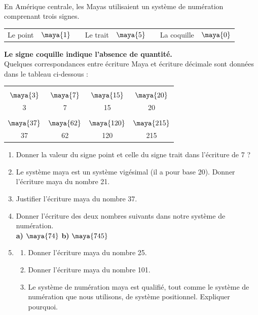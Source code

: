 \activites 

\begin{activite}
   \ \\ [-16mm]
   \begin{QCM}
      En Amérique centrale, les Mayas utilisaient un système de numération comprenant trois signes.
\begin{center}
   \begin{tabular}{ccp{1cm}ccp{1cm}cc}
      Le point & \Large$\maya{1}$ & & Le trait & \Large$\maya{5}$ & & La coquille & \Large$\maya{0}$ \\   
   \end{tabular}
\end{center}
{\bf Le signe \og coquille \fg{} indique l'absence de quantité.} \\ [2mm]
Quelques correspondances entre écriture Maya et écriture décimale sont données dans le tableau ci-dessous :
\begin{center}
   {
   \begin{tabular}{|C{2}|C{2}|C{2}|C{2}|}
      \hline
      &&&\\ [-5mm]
      \huge$\maya{3}$ & \Large$\maya{7}$ & \Large$\maya{15}$ & \Large$\maya{20}$ \\
      3 & 7 & 15 & 20 \\
      \hline
      &&&\\ [-5mm]
      \Large$\maya{37}$ & \Large$\maya{62}$ & \Large$\maya{120}$ & \Large$\maya{215}$ \\
      37 & 62 & 120 & 215 \\
      \hline
   \end{tabular}}
\end{center}
\begin{enumerate}
   \item Donner la valeur du signe \og point \fg{} et celle du signe \og trait \fg{} dans l’écriture de 7 ?    
   \item Le système maya est un système vigésimal (il a pour base 20). Donner l’écriture maya du nombre 21.     
   \item Justifier l’écriture maya du nombre 37.   
   \item Donner l’écriture des deux nombres suivants dans notre système de numération. \\ [2mm]
      \textcolor{B1}{\bf a)} {\Large$\maya{74}$} \qquad\qquad \textcolor{B1}{\bf b)} {\Large$\maya{745}$} \\
   \item 
      \begin{enumerate}
         \item Donner l'écriture maya du nombre 25.
         \item Donner l'écriture maya du nombre 101.
         \item Le système de numération maya est qualifié, tout comme le système de numération que nous utilisons, de système positionnel. Expliquer pourquoi.
      \end{enumerate}
   \end{enumerate}
\end{QCM}


\end{activite}
